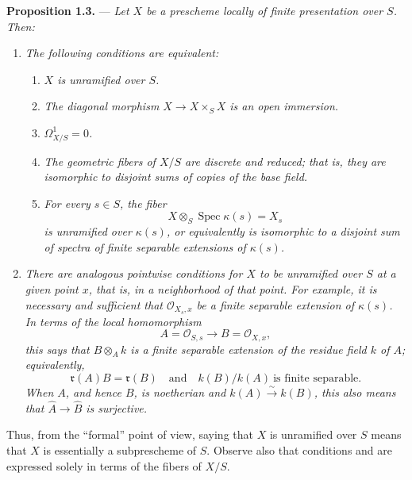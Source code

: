 \medskip
\noindent{}\textbf{Proposition 1.3.} ---
\textit{Let \(X\) be a prescheme locally of finite presentation over
\(S\).  Then:}

\begin{enumerate}
\item[(i)]  \textit{The following conditions are equivalent:}
  \begin{enumerate}
  \item[(a)]  \textit{\(X\) is unramified over \(S\).}
  \item[(b)]  \textit{The diagonal morphism
  \(X\to X\times_S X\) is an open immersion.}
  \item[(c)]  \textit{\(\Omega^1_{X/S}=0\).}
  \item[(d)]  \textit{The geometric fibers of \(X/S\) are discrete and
  reduced; that is, they are isomorphic to disjoint sums of copies of
  the base field.}
  \item[(e)]  \textit{For every \(s\in S\), the fiber
  \[
    X\otimes_S\operatorname{Spec}\kappa(s)=X_s
  \]
  is unramified over \(\kappa(s)\), or equivalently is isomorphic to a
  disjoint sum of spectra of finite separable extensions of
  \(\kappa(s)\).}
  \end{enumerate}

\item[(ii)]  \textit{There are analogous pointwise conditions for
\(X\) to be unramified over \(S\) at a given point \(x\), that is, in
a neighborhood of that point.  For example, it is necessary and
sufficient that \(\mathscr O_{X_s,x}\) be a finite separable extension
of \(\kappa(s)\).  In terms of the local homomorphism
\[
  A=\mathscr O_{S,s}\longrightarrow B=\mathscr O_{X,x},
\]
this says that \(B\otimes_A k\) is a finite separable extension of
the residue field \(k\) of \(A\); equivalently,
\[
  \mathfrak r(A)B=\mathfrak r(B)
  \quad\text{and}\quad
  k(B)/k(A)\ \text{is finite separable}.
\]
When \(A\), and hence \(B\), is noetherian and
\(k(A)\xrightarrow{\sim}k(B)\), this also means that
\(\widehat A\to\widehat B\) is surjective.}
\end{enumerate}

Thus, from the ``formal'' point of view, saying that \(X\) is
unramified over \(S\) means that \(X\) is essentially a subprescheme
of \(S\).  Observe also that conditions  and  are expressed
solely in terms of the fibers of \(X/S\).

